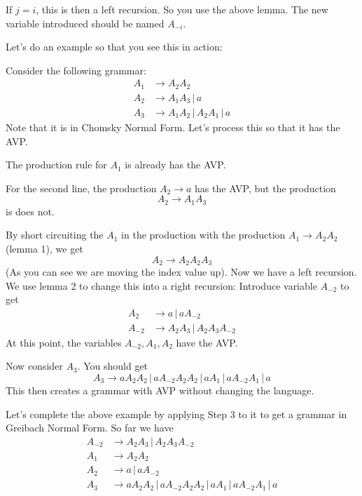 If $j=i$, this is then a left recursion. So you use the above
lemma. The new variable introduced should be named $A_{-i}$.

Let's do an example so that you see this in action:

\begin{eg}
 Consider the following grammar:
 \begin{align*}
  A_1 &\rightarrow A_2 A_2 \\
  A_2 &\rightarrow A_1 A_3 \,|\, a \\
  A_3 &\rightarrow A_1 A_2 \,|\, A_2 A_1 \,|\, a
 \end{align*}
Note that it is in Chomsky Normal Form. Let's process this so that
it has the AVP.

The production rule for $A_1$ is already has the AVP.

For the second line, the production $A_2 \rightarrow a$ has the
AVP, but the production
 \[
  A_2 \rightarrow A_1 A_3
 \]
 is does not.

By short circuiting the $A_1$ in the production with the
production $A_1 \rightarrow A_2A_2$ (lemma 1), we get
\[
 A_2 \rightarrow A_2 A_2 A_3
\]
(As you can see we are moving the index value up). Now we have a
left recursion. We use lemma 2 to change this into a right
recursion: Introduce variable $A_{-2}$ to get
\begin{align*}
 A_2 &\rightarrow a \,|\, aA_{-2} \\
 A_{-2} &\rightarrow A_2 A_3 \,|\, A_2 A_3 A_{-2}
\end{align*}
At this point, the variables $A_{-2}, A_1, A_2$ have the AVP.

Now consider $A_3$. You should get
\[
 A_3 \rightarrow aA_2A_2 \,|\, aA_{-2}A_2A_2 \,|\, aA_1 \,|\, a
 A_{-2} A_1 \,|\, a
\]
This then creates a grammar with AVP without changing the
language.
\end{eg}

\begin{eg}
Let's complete the above example by applying Step 3 to it to get a
grammar in Greibach Normal Form. So far we have
\begin{align*}
A_{-2} &\rightarrow A_2 A_3 \,|\, A_2 A_3 A_{-2} \\
A_1 &\rightarrow A_2A_2 \\
A_2 &\rightarrow a \,|\, a A_{-2} \\
A_3 &\rightarrow aA_2 A_2 \,|\, a A_{-2} A_2 A_2 \,|\, aA_1 \,|\,
a A_{-2} A_1 \,|\, a \\
\end{align*}
\end{eg}

